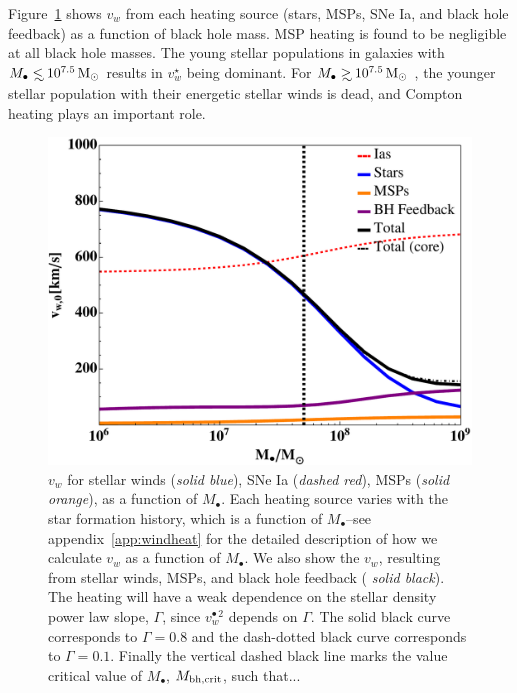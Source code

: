 \documentclass[usenatbib,fleqn]{mn2e}
\newcommand\lsim{\mathrel{\rlap{\lower4pt\hbox{\hskip1pt$\sim$}}
    \raise1pt\hbox{$<$}}}
\newcommand\gsim{\mathrel{\rlap{\lower4pt\hbox{\hskip1pt$\sim$}}
    \raise1pt\hbox{$>$}}}
\newcommand{\Mbh}[1][]{M_{\bullet#1}}
\newcommand{\vwO}{v_{w}}
\begin{document}
Figure~\ref{fig:vwSources} shows $\vwO$ from each heating source (stars, MSPs, SNe Ia, and black hole
feedback) as a function of black hole mass.  MSP heating is found to be negligible at all black hole masses.  The young stellar populations in galaxies with $\Mbh\lsim 10^{7.5} \Msun$ results in $v_{w}^{\star}$ being dominant.  For $\Mbh\gsim 10^{7.5} \Msun$ , the younger stellar population with their energetic
stellar winds is dead, and Compton heating plays an important role.


\begin{figure}
\includegraphics[width=\columnwidth]{vwSources.pdf}
\caption{\label{fig:vwSources} $\vwO$ for stellar winds ({\it solid
    blue}), SNe Ia ({\it dashed red}), MSPs ({\it solid orange}), as a
  function of $\Mbh$. Each heating source varies with the star
  formation history, which is a function of $\Mbh$--see
  appendix~\ref{app:windheat} for the detailed description of how we
  calculate $\vwO$ as a function of $\Mbh$. We also show the $\vwO$,
  resulting from stellar winds, MSPs, and black hole feedback ({\it
    solid black}). The heating will have a weak dependence on the
  stellar density power law slope, $\Gamma$, since $v_{w}^{\bullet \,
    2}$ depends on $\Gamma$. The solid black curve corresponds to
  $\Gamma=0.8$ and the dash-dotted black curve corresponds to
  $\Gamma=0.1$. Finally the vertical dashed black line marks the value
  critical value of $\Mbh$, $M_{\rm bh, crit}$, such that... }
\end{figure}
\end{document}
